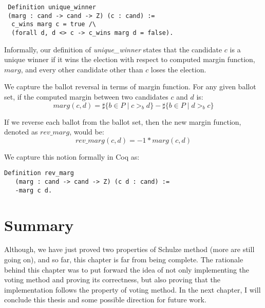  \begin{verbatim}
 Definition unique_winner 
 (marg : cand -> cand -> Z) (c : cand) :=
  c_wins marg c = true /\
  (forall d, d <> c -> c_wins marg d = false).
\end{verbatim}  

Informally, our definition of \textit{unique\_winner} states that the candidate $c$ is a unique winner
if it wins the election with respect to computed margin function, $marg$, and every other candidate 
other than $c$ loses the election. 

We capture the ballot reversal in terms of margin function. For any given ballot set, if the computed 
margin between two candidates $c$ and $d$ is: 
\[
  marg(c, d) = \sharp \lbrace b \in P \mid c >_b d \rbrace -
            \sharp \lbrace b \in P \mid d >_b c \rbrace
\] 

If we reverse each ballot from the ballot set, then the new margin function, denoted as $rev\_marg$, would be:
\[
  rev\_marg(c, d) = -1 * marg (c, d)
\] 

We capture this notion formally in Coq as:

\begin{verbatim}
Definition rev_marg 
   (marg : cand -> cand -> Z) (c d : cand) :=
   -marg c d.
\end{verbatim}




 
 	
 
 \section{Summary}
 Although, we have just proved two properties of Schulze method (more are still going on), and so far, this chapter 
 is far from being complete. The rationale behind this chapter was to put forward the idea of 
 not only implementing the voting method and proving its correctness, but also proving that the implementation 
 follows the property of voting method. In the next chapter, I will conclude this thesis and some possible 
 direction for future work. 
 
 
 
